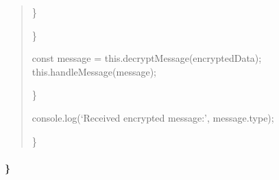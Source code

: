 \documentclass[letterpaper,10pt,english]{sphinxmanual}
\begin{document}
\begin{quote}
\begin{description}
\begin{description}
\end{description}

\sphinxAtStartPar
\}

\end{description}

\sphinxAtStartPar
\}
\begin{description}
\sphinxAtStartPar
const message = this.decryptMessage(encryptedData);
this.handleMessage(message);

\end{description}

\sphinxAtStartPar
\}
\begin{description}
\sphinxAtStartPar
console.log(‘Received encrypted message:’, message.type);

\end{description}

\sphinxAtStartPar
\}
\end{quote}


\paragraph{\}}
\label{\detokenize{api/websocket-api:id150}}
\end{document}
